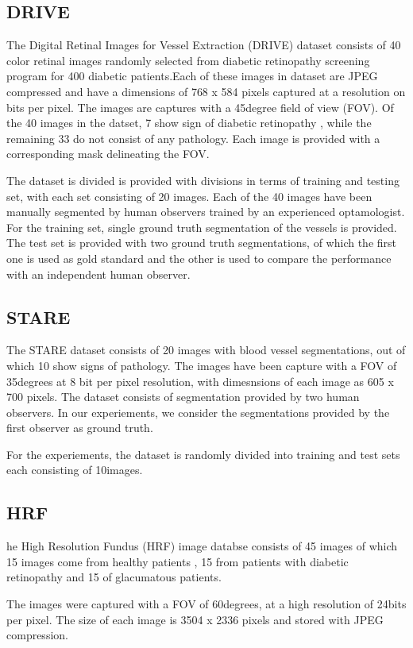 \subsection{DRIVE}
The Digital Retinal Images for Vessel Extraction (DRIVE) dataset consists of 40 color retinal images randomly selected from diabetic retinopathy screening program for 400 diabetic patients.Each of these images in dataset are JPEG compressed and have a dimensions of 768 x 584 pixels captured at a resolution on bits per pixel. The images are captures with a 45degree field of view (FOV).
Of the 40 images in the datset, 7 show sign of diabetic retinopathy , while the remaining 33 do not consist of any pathology. Each image is provided with a corresponding mask delineating the FOV.

The dataset is divided is provided with divisions in terms of training and testing set, with each set consisting of 20 images. Each of the 40 images have been manually segmented by human observers trained by an experienced optamologist. For the training set, single ground truth segmentation of the vessels is provided. The test set is provided with two ground truth segmentations, of which the first one is used as gold standard and the other is used to compare the performance with an independent human observer.

\subsection{STARE}
The STARE dataset consists of 20 images with blood vessel segmentations, out of which 10 show signs of pathology. The images have been capture with a FOV of 35degrees at 8 bit per pixel resolution, with dimesnsions of each image as 605 x 700 pixels. The dataset consists of segmentation provided by two human observers. In our experiements, we consider the segmentations provided by the first observer as ground truth.

For the experiements, the dataset is randomly divided into training and test sets each consisting of 10images.

\subsection{HRF}
he High Resolution Fundus (HRF) image databse consists of 45 images of which 15 images come from healthy patients , 15 from patients with diabetic retinopathy and 15 of glacumatous patients.

The images were captured with a FOV of 60degrees, at a high resolution of 24bits per pixel. The size of each image is 3504 x 2336 pixels and stored with JPEG compression. 

